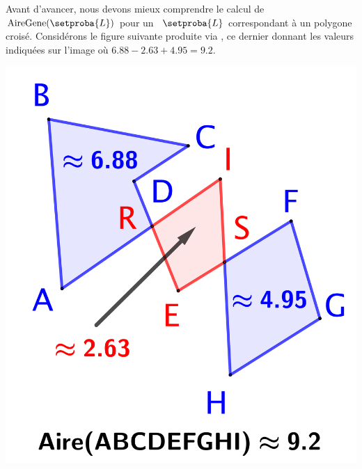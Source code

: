 %
%
%
%
\newpage%


Avant d'avancer, nous devons mieux comprendre le calcul de $\garea{\setproba{L}}$ pour un \ncycle\ $\setproba{L}$ correspondant à un polygone croisé.
Considérons le figure suivante produite via \geogebra, ce dernier donnant les valeurs indiquées sur l'image où $\num{6.88} - \num{2.63} + \num{4.95} = \num{9.2}$.


\begin{center}
    \includegraphics[scale=.35]{content/polygon/at-least-one/garea-trick.png}
\end{center}


